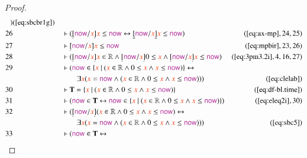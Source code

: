 \begin{proof}
\begin{align}
      )&(\mbox{\ref{eq:sbcbr1g}})\notag
  \\ 26 &&  & \vdash ( \underaccent{\dot}{[} \mathsf{\mc{now}} / \msc{x}
      \underaccent{\dot}{]} \msc{x} \le \mathsf{\mc{now}}
      \leftrightarrow \underline{[} \mathsf{\mc{now}} /
      \msc{x} \underline{]} \msc{x} \le \mathsf{\mc{now}}
      )&(\mbox{\ref{eq:ax-mp}},24,25)\notag
  \\ 27 &&  & \vdash \underaccent{\dot}{[} \mathsf{\mc{now}} / \msc{x}
      \underaccent{\dot}{]} \msc{x} \le
      \mathsf{\mc{now}}&(\mbox{\ref{eq:mpbir}},23,26)\notag
  \\ 28 &&  & \vdash ( \underaccent{\dot}{[} \mathsf{\mc{now}} / \msc{x}
      \underaccent{\dot}{]} \msc{x} \in \mathbb{R} \wedge
      \underaccent{\dot}{[} \mathsf{\mc{now}} / \msc{x}
      \underaccent{\dot}{]} 0 \le \msc{x} \wedge
      \underaccent{\dot}{[} \mathsf{\mc{now}} / \msc{x}
      \underaccent{\dot}{]} \msc{x} \le \mathsf{\mc{now}}
      )&(\mbox{\ref{eq:3pm3.2i}},4,16,27)\notag
  \\ 29 &&  & \vdash ( \mathsf{\mc{now}} \in \{ \msc{x}~\vert~( \msc{x} \in
      \mathbb{R} \wedge 0 \le \msc{x} \wedge \msc{x} \le
      \mathsf{\mc{now}} ) \} \leftrightarrow  \notag \\ & & & \qquad
      \exists
      \msc{x} ( \msc{x} = \mathsf{\mc{now}} \wedge (
      \msc{x} \in \mathbb{R} \wedge 0 \le \msc{x} \wedge
      \msc{x} \le \mathsf{\mc{now}} ) )
      )&(\mbox{\ref{eq:clelab}})\notag
  \\ 30 &&  & \vdash \mathbf{T} = \{ \msc{x}~\vert~( \msc{x} \in \mathbb{R} \wedge
      0 \le \msc{x} \wedge \msc{x} \le \mathsf{\mc{now}} )
      \}&(\mbox{\ref{eq:df-bl.time}})\notag
  \\ 31 &&  & \vdash ( \mathsf{\mc{now}} \in \mathbf{T} \leftrightarrow
      \mathsf{\mc{now}} \in \{ \msc{x}~\vert~( \msc{x} \in
      \mathbb{R} \wedge 0 \le \msc{x} \wedge \msc{x} \le
      \mathsf{\mc{now}} ) \}
      )&(\mbox{\ref{eq:eleq2i}},30)\notag
  \\ 32 &&  & \vdash ( \underaccent{\dot}{[} \mathsf{\mc{now}} / \msc{x}
      \underaccent{\dot}{]} ( \msc{x} \in \mathbb{R} \wedge
      0 \le \msc{x} \wedge \msc{x} \le \mathsf{\mc{now}} )
      \leftrightarrow  \notag \\ & & & \qquad
      \exists \msc{x} ( \msc{x} =
      \mathsf{\mc{now}} \wedge ( \msc{x} \in \mathbb{R}
      \wedge 0 \le \msc{x} \wedge \msc{x} \le
      \mathsf{\mc{now}} ) ) )&(\mbox{\ref{eq:sbc5}})\notag
  \\ 33 &&  & \vdash ( \mathsf{\mc{now}} \in \mathbf{T} \leftrightarrow

\end{align}
\end{proof}
